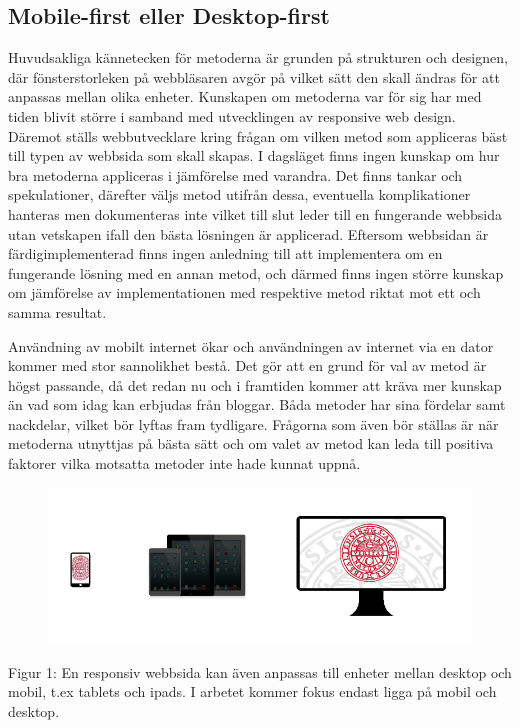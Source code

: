 \documentclass[11pt]{article}
\begin{document}
\subsection{Mobile-first eller Desktop-first}
Huvudsakliga kännetecken för metoderna är grunden på strukturen och designen, där fönsterstorleken på webbläsaren avgör på vilket sätt den skall ändras för att anpassas mellan olika enheter. Kunskapen om metoderna var för sig har med tiden blivit större i samband med utvecklingen av responsive web design. Däremot ställs webbutvecklare kring frågan om vilken metod som appliceras bäst till typen av webbsida som skall skapas. I dagsläget finns ingen kunskap om hur bra metoderna appliceras i jämförelse med varandra. Det finns tankar och spekulationer, därefter väljs metod utifrån dessa, eventuella komplikationer hanteras men dokumenteras inte vilket till slut leder till en fungerande webbsida utan vetskapen ifall den bästa lösningen är applicerad. Eftersom webbsidan är färdigimplementerad finns ingen anledning till att implementera om en fungerande lösning med en annan metod, och därmed finns ingen större kunskap om jämförelse av implementationen med respektive metod riktat mot ett och samma resultat.

Användning av mobilt internet ökar och användningen av internet via en dator kommer med stor sannolikhet bestå. Det gör att en grund för val av metod är högst passande, då det redan nu och i framtiden kommer att kräva mer kunskap än vad som idag kan erbjudas från bloggar. Båda metoder har sina fördelar samt nackdelar, vilket bör lyftas fram tydligare. Frågorna som även bör ställas är när metoderna utnyttjas på bästa sätt och om valet av metod kan leda till positiva faktorer vilka motsatta metoder inte hade kunnat uppnå.

\begin{figure}[h]
\centerline{%
\includegraphics[scale=0.6]{pics/olikaenheter.png}
}
\end{figure}
\vspace{1.5cm}
Figur 1: En responsiv webbsida kan även anpassas till enheter mellan desktop och mobil, t.ex  tablets och ipads.  I arbetet kommer fokus endast ligga på mobil och desktop.
\end{document}
